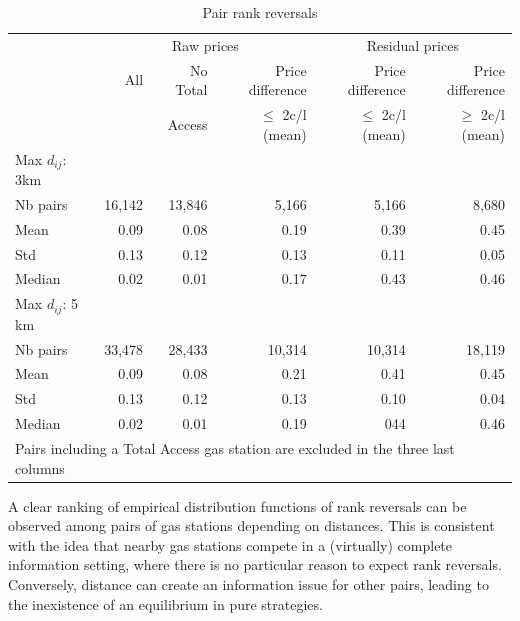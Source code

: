 \documentclass[11pt]{article}
\begin{document}
\begin{table}
\caption{Pair rank reversals}
\centering
\begin{tabular}{lrrrrr}
\hline
{} & \multicolumn{3}{c}{Raw prices} & \multicolumn{2}{c}{Residual prices}  \\
{} & All & No Total & Price difference & Price difference & Price difference \\
{} & {} & Access & $\le$ 2c/l (mean) & $\le$ 2c/l (mean) & $\ge$ 2c/l (mean)\\
\hline
Max $d_{ij}$: 3km & {} & {} & {} & {} & {} \\
\hline
Nb pairs & 16,142 & 13,846 & 5,166 & 5,166 & 8,680 \\
Mean & 0.09 & 0.08 & 0.19 & 0.39 & 0.45 \\
Std & 0.13 & 0.12 & 0.13 & 0.11 & 0.05 \\
Median & 0.02 & 0.01 & 0.17 & 0.43 & 0.46 \\
\hline
Max $d_{ij}$: 5 km & {} & {} & {} & {} & {} \\
\hline
Nb pairs & 33,478 & 28,433 & 10,314 & 10,314 & 18,119 \\
Mean & 0.09 & 0.08 & 0.21 & 0.41 & 0.45 \\
Std & 0.13 & 0.12 & 0.13 & 0.10 & 0.04 \\
Median & 0.02 & 0.01 & 0.19 & 044 & 0.46 \\
\hline
\multicolumn{6}{l}{\small Pairs including a Total Access gas station are excluded in the three last columns}\\
\end{tabular}
\end{table}

A clear ranking of empirical distribution functions of rank reversals can be observed among pairs of gas stations depending on distances. This is consistent with the idea that nearby gas stations compete in a (virtually) complete information setting, where there is no particular reason to expect rank reversals. Conversely, distance can create an information issue for other pairs, leading to the inexistence of an equilibrium in pure strategies.
\end{document}
